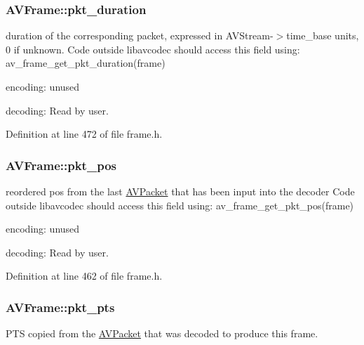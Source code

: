 \subsubsection[{\texorpdfstring{pkt\+\_\+duration}{pkt_duration}}]{ A\+V\+Frame\+::pkt\+\_\+duration}\hypertarget{struct_a_v_frame_a385c44d7cafe80cad82fe46e25cab221}{}\label{struct_a_v_frame_a385c44d7cafe80cad82fe46e25cab221}
duration of the corresponding packet, expressed in A\+V\+Stream-\/$>$time\+\_\+base units, 0 if unknown. Code outside libavcodec should access this field using\+: av\+\_\+frame\+\_\+get\+\_\+pkt\+\_\+duration(frame)
\begin{DoxyItemize}
\item encoding\+: unused
\item decoding\+: Read by user. 
\end{DoxyItemize}

Definition at line 472 of file frame.\+h.

\subsubsection[{\texorpdfstring{pkt\+\_\+pos}{pkt_pos}}]{ A\+V\+Frame\+::pkt\+\_\+pos}\hypertarget{struct_a_v_frame_a3bc83474709406b511c4f3498182d18a}{}\label{struct_a_v_frame_a3bc83474709406b511c4f3498182d18a}
reordered pos from the last \hyperlink{struct_a_v_packet}{A\+V\+Packet} that has been input into the decoder Code outside libavcodec should access this field using\+: av\+\_\+frame\+\_\+get\+\_\+pkt\+\_\+pos(frame)
\begin{DoxyItemize}
\item encoding\+: unused
\item decoding\+: Read by user. 
\end{DoxyItemize}

Definition at line 462 of file frame.\+h.

\subsubsection[{\texorpdfstring{pkt\+\_\+pts}{pkt_pts}}]{ A\+V\+Frame\+::pkt\+\_\+pts}\hypertarget{struct_a_v_frame_a47f555732f9c18928de727a163cd7cb6}{}\label{struct_a_v_frame_a47f555732f9c18928de727a163cd7cb6}
P\+TS copied from the \hyperlink{struct_a_v_packet}{A\+V\+Packet} that was decoded to produce this frame. 

